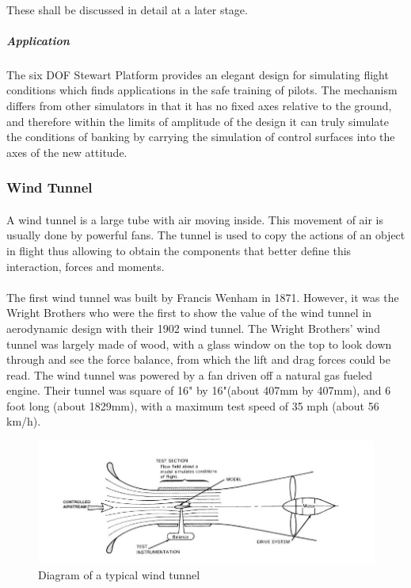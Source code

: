 \paragraph{}These shall be discussed in detail at a later stage.
\subparagraph{Application}
\paragraph{}The six DOF Stewart Platform provides an elegant design for simulating flight conditions which finds applications in the safe training of pilots. The mechanism differs from other simulators in that it has no fixed axes relative to the ground, and therefore within the limits of amplitude of the design it can truly simulate the conditions of banking by carrying the simulation of control surfaces into the axes of the new attitude.
\subsubsection{Wind Tunnel}
\paragraph{}
A wind tunnel is a large tube with air moving inside. This movement of air is usually done by powerful fans. The tunnel is used to copy the actions of an object in flight thus allowing
to obtain the components that better define this interaction, forces and moments.
\paragraph{} The first wind tunnel was built by
Francis Wenham in 1871. However, it was the Wright Brothers who were the first to show the value of the wind tunnel in aerodynamic design with their 1902 wind tunnel.  The Wright Brothers’ wind tunnel was largely made of wood, with a glass window on the top to look down through and see the force balance, from which the
lift and drag forces could be read. The wind tunnel was powered by a fan driven off a natural gas fueled engine. Their tunnel was square of 16" by 16"(about 407mm by 407mm), and 6 foot long (about 1829mm), with a maximum test speed of 35 mph (about 56 km/h).
\begin{center}
	\begin{figure}[!h]
	\centering
	\includegraphics{Figures/Fig2}
	\caption{Diagram of a typical wind tunnel}
	\end{figure}
\end{center}
